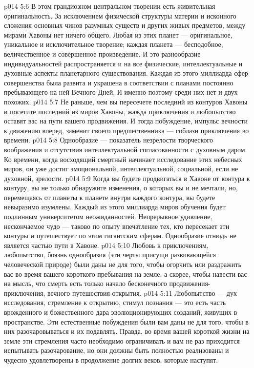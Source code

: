 \vs p014 5:6 \pc В этом грандиозном центральном творении есть живительная оригинальность. За исключением физической структуры материи и исконного сложения основных чинов разумных существ и других живых предметов, между мирами Хавоны нет ничего общего. Любая из этих планет --- оригинальное, уникальное и исключительное творение; каждая планета --- бесподобное, величественное и совершенное произведение. И это разнообразие индивидуальностей распространяется и на все физические, интеллектуальные и духовные аспекты планетарного существования. Каждая из этого миллиарда сфер совершенства была развита и украшена в соответствии с планами постоянно пребывающего на ней Вечного Дней. И именно поэтому среди них нет и двух похожих.
\vs p014 5:7 Не раньше, чем вы пересечете последний из контуров Хавоны и посетите последний из миров Хавоны, жажда приключения и любопытство оставят вас на пути вашего продвижения. И тогда побуждение, импульс вечности к движению вперед, заменит своего предшественника --- соблазн приключения во времени.
\vs p014 5:8 Однообразие --- показатель незрелости творческого воображения и отсутствия интеллектуальной согласованности с духовным даром. Ко времени, когда восходящий смертный начинает исследование этих небесных миров, он уже достиг эмоциональной, интеллектуальной, социальной, если не духовной, зрелости.
\vs p014 5:9 Когда вы будете продвигаться в Хавоне от контура к контуру, вы не только обнаружите изменения, о которых вы и не мечтали, но, перемещаясь от планеты к планете внутри каждого контура, вы будете невыразимо изумлены. Каждый из этого миллиарда миров обучения будет подлинным университетом неожиданностей. Непрерывное удивление, нескончаемое чудо --- таково по опыту впечатление тех, кто пересекает эти контуры и путешествует по этим гигантским сферам. Однообразие отнюдь не является частью пути в Хавоне.
\vs p014 5:10 Любовь к приключениям, любопытство, боязнь однообразия (эти черты присущи развивающейся человеческой природе) были даны не для того, чтобы огорчить или раздражить вас во время вашего короткого пребывания на земле, а скорее, чтобы навести вас на мысль, что смерть есть только начало бесконечного продвижения\hyp{}приключения, вечного путешествия\hyp{}открытия.
\vs p014 5:11 Любопытство --- дух исследования, стремление к открытию, стимул познания --- это есть часть врожденного и божественного дара эволюционирующих созданий, живущих в пространстве. Эти естественные побуждения были вам даны не для того, чтобы в них разочаровываться и их подавлять. Правда, во время вашей короткой жизни на земле эти стремления часто необходимо ограничивать и вам не раз приходится испытывать разочарование, но они должны быть полностью реализованы и чудесно удовлетворены в продолжение долгих веков, которые наступят.
